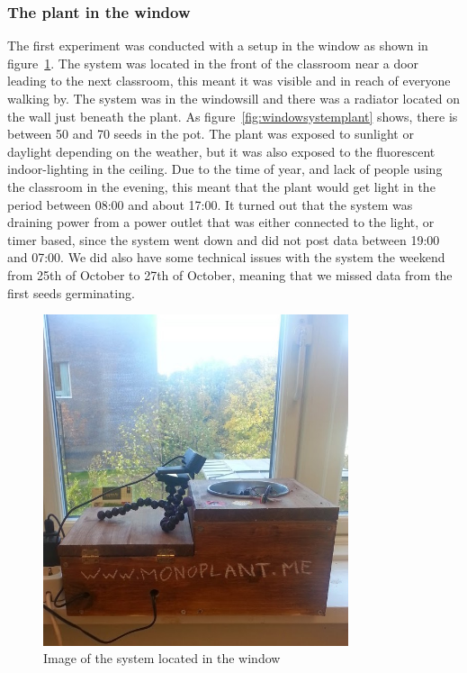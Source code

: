 \subsubsection*{The plant in the window}
The first experiment was conducted with a setup in the window as shown in figure~\ref{fig:windowplant}. The system was located in the front of the classroom near a door leading to the next classroom, this meant it was visible and in reach of everyone walking by. The system was in the windowsill and there was a radiator located on the wall just beneath the plant. As figure~\ref{fig:windowsystemplant} shows, there is between 50 and 70 seeds in the pot. The plant was exposed to sunlight or daylight depending on the weather, but it was also exposed to the fluorescent indoor-lighting in the ceiling. Due to the time of year, and lack of people using the classroom in the evening, this meant that the plant would get light in the period between 08:00 and about 17:00. It turned out that the system was draining power from a power outlet that was either connected to the light, or timer based, since the system went down and did not post data between 19:00 and 07:00. We did also have some technical issues with the system the weekend from 25th of October to 27th of October, meaning that we missed data from the first seeds germinating.

\begin{figure}
\centering
\includegraphics[width=0.8\textwidth]{img/empiricalsetting/window.jpg}
\caption{Image of the system located in the window}
\label{fig:windowplant}
\end{figure}

